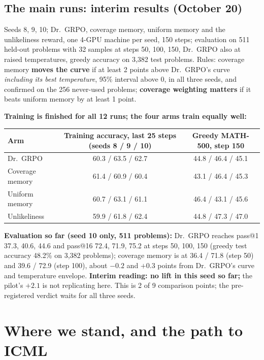 \documentclass[11pt]{article}
\begin{document}
\subsection{The main runs: interim results (October 20)}
Seeds 8, 9, 10; Dr.\ GRPO, coverage memory, uniform memory and the unlikeliness reward, one 4-GPU machine per seed, 150 steps; evaluation on 511 held-out problems with 32 samples at steps 50, 100, 150, Dr.\ GRPO also at raised temperatures, greedy accuracy on 3,382 test problems. Rules: coverage memory \textbf{moves the curve} if at least 2 points above Dr.\ GRPO's curve \emph{including its best temperature}, 95\% interval above 0, in all three seeds, and confirmed on the 256 never-used problems; \textbf{coverage weighting matters} if it beats uniform memory by at least 1 point.

\textbf{Training is finished for all 12 runs; the four arms train equally well:}
\begin{center}\small
\begin{tabular}{@{}lcc@{}}
\toprule
Arm & Training accuracy, last 25 steps (seeds 8 / 9 / 10) & Greedy MATH-500, step 150\\
\midrule
Dr.\ GRPO & 60.3 / 63.5 / 62.7 & 44.8 / 46.4 / 45.1\\
Coverage memory & 61.4 / 60.9 / 60.4 & 43.1 / 46.4 / 45.3\\
Uniform memory & 60.7 / 63.1 / 61.1 & 46.4 / 43.1 / 45.6\\
Unlikeliness & 59.9 / 61.8 / 62.4 & 44.8 / 47.3 / 47.0\\
\bottomrule
\end{tabular}
\end{center}
\textbf{Evaluation so far (seed 10 only, 511 problems):} Dr.\ GRPO reaches pass@1 37.3, 40.6, 44.6 and pass@16 72.4, 71.9, 75.2 at steps 50, 100, 150 (greedy test accuracy 48.2\% on 3,382 problems); coverage memory is at 36.4 / 71.8 (step 50) and 39.6 / 72.9 (step 100), about $-0.2$ and $+0.3$ points from Dr.\ GRPO's curve and temperature envelope. \textbf{Interim reading: no lift in this seed so far;} the pilot's $+2.1$ is not replicating here. This is 2 of 9 comparison points; the pre-registered verdict waits for all three seeds.

\section{Where we stand, and the path to ICML}
\end{document}
